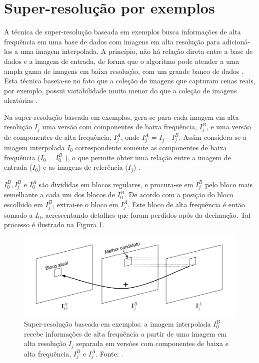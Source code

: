 \section{Super-resolução por exemplos}
\label{SR_exemp}
A técnica de super-resolução baseada em exemplos busca informações de alta frequência em uma base de dados com imagens em alta resolução para adicioná-los a uma imagem interpolada. A princípio, não há relação direta entre a base de dados e a imagem de entrada, de forma que o algoritmo pode atender a uma ampla gama de imagens em baixa resolução, com um grande banco de dados \cite{freeman2002example}. Esta técnica baseia-se no fato que a coleção de imagens que capturam cenas reais, por exemplo, possui variabilidade muito menor do que a coleção de imagens aleatórias \cite{garcia2013tecnicas}.

Na super-resolução baseada em exemplos, gera-se para cada imagem em alta resolução $I_j$ uma versão com componentes de baixa frequência, $I_j^B$, e uma versão de componentes de alta frequência, $I_j^A$, onde $I_j^A$ = $I_j$ - $I_j^B$. Assim considera-se a imagem interpolada $I_0$ correspondente somente as componentes de baixa frequência ($I_0 = I_0^B$ ), o que permite obter uma relação entre a imagem de entrada ($I_0$) e as imagens de referência ($I_j$) \cite{garcia2013tecnicas}.

$I_0^B, I_j^B$ e $I_0^A$ são divididas em blocos regulares, e procura-se em $I^B_j$ pelo bloco mais semelhante a cada um dos blocos de $I_0^B$. De acordo com a posição do bloco escolhido em $I_j^B$, extrai-se o bloco em $I_j^A$. Este bloco de alta frequência é então somado a $I_0$, acrescentando detalhes que foram perdidos após da decimação. Tal processo é ilustrado na Figura \ref{fig:SR_4}.

\begin{figure}[h]
	\centering
	\includegraphics[scale=0.50]{figuras/superresolucao_4.png}
	\caption{Super-resolução baseada em exemplos: a imagem interpolada $I_0^B$ recebe informações de alta frequência a partir de uma imagem em alta resolução $I_j$ separada em versões com componentes de baixa e alta frequência, $I_j^B$ e $I_j^A$. Fonte: \cite{garcia2013tecnicas}.}

	\label{fig:SR_4}
\end{figure}

